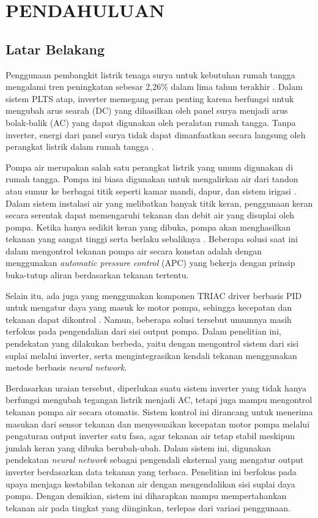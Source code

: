 \chapter{PENDAHULUAN}
\label{chap:pendahuluan}

\section{Latar Belakang}
\label{sec:latarbelakang}

Penggunaan pembangkit listrik tenaga surya untuk kebutuhan rumah tangga
mengalami tren peningkatan sebesar 2{,}26\% dalam lima tahun terakhir 
\parencite{article}. Dalam sistem PLTS atap, inverter memegang peran penting 
karena berfungsi untuk mengubah arus searah (DC) yang dihasilkan oleh panel 
surya menjadi arus bolak-balik (AC) yang dapat digunakan oleh peralatan 
rumah tangga. Tanpa inverter, energi dari panel surya tidak dapat 
dimanfaatkan secara langsung oleh perangkat listrik dalam rumah tangga 
\parencite{10695139}.

Pompa air merupakan salah satu perangkat listrik yang umum digunakan 
di rumah tangga. Pompa ini biasa digunakan untuk mengalirkan air dari 
tandon atau sumur ke berbagai titik seperti kamar mandi, dapur, 
dan sistem irigasi \parencite{SENTHILKUMAR2020303}. Dalam sistem 
instalasi air yang melibatkan banyak titik keran, penggunaan keran 
secara serentak dapat memengaruhi tekanan dan debit air yang disuplai 
oleh pompa. Ketika hanya sedikit keran yang dibuka, pompa akan menghasilkan 
tekanan yang sangat tinggi serta berlaku sebaliknya \parencite{anakub}.
Beberapa solusi saat ini dalam mengontrol tekanan pompa air secara konstan 
adalah dengan menggunakan \emph{automatic pressure control} (APC) yang 
bekerja dengan prinsip buka-tutup aliran berdasarkan tekanan tertentu.

Selain itu, ada juga yang menggunakan komponen TRIAC driver berbasis PID 
untuk mengatur daya yang masuk ke motor pompa, sehingga kecepatan dan 
tekanan dapat dikontrol \parencite{anakits}. Namun, beberapa solusi 
tersebut umumnya masih terfokus pada pengendalian dari sisi output pompa. 
Dalam penelitian ini, pendekatan yang dilakukan berbeda, yaitu 
dengan mengontrol sistem dari sisi suplai melalui inverter, serta 
mengintegrasikan kendali tekanan menggunakan metode berbasis \emph{neural network}. 

Berdasarkan uraian tersebut, diperlukan suatu sistem inverter yang 
tidak hanya berfungsi mengubah tegangan listrik menjadi AC, tetapi 
juga mampu mengontrol tekanan pompa air secara otomatis. Sistem kontrol 
ini dirancang untuk menerima masukan dari sensor tekanan dan menyesuaikan 
kecepatan motor pompa melalui pengaturan output inverter satu fasa, agar 
tekanan air tetap stabil meskipun jumlah keran yang dibuka berubah-ubah. 
Dalam sistem ini, digunakan pendekatan \emph{neural network} sebagai 
pengendali eksternal yang mengatur output inverter berdasarkan data 
tekanan yang terbaca. Penelitian ini berfokus pada upaya menjaga 
kestabilan tekanan air dengan mengendalikan sisi suplai daya pompa. 
Dengan demikian, sistem ini diharapkan mampu mempertahankan tekanan 
air pada tingkat yang diinginkan, terlepas dari variasi penggunaan.

